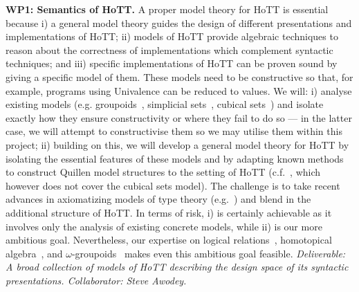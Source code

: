 \documentclass[a4paper,11pt]{article}
\begin{document}
{\bf WP1: Semantics of HoTT.}  A proper model theory for HoTT is
essential because i) a general model theory guides the design of
different presentations and implementations of HoTT; ii) models of
HoTT provide algebraic techniques to reason about the correctness of
implementations which complement syntactic techniques; and iii)
specific implementations of HoTT can be proven sound by giving a
specific model of them.  These models need to be constructive so that,
for example, programs using Univalence can be reduced to values.  We
will: i) analyse existing models ({e.g.}
groupoids~\cite{HofmannM:groitt}, simplicial
sets~\cite{KapulkinC:simmuv}, cubical sets~\cite{BezemM:cubsmt}) and
isolate exactly how they ensure constructivity or where they fail to
do so --- in the latter case, we will attempt to constructivise them
so we may utilise them within this project; ii) building on this, we
will develop a general model theory for HoTT by isolating the
essential features of these models and by adapting known methods to
construct Quillen model structures to the setting of HoTT
({c.f.}~\cite{ShulmanM:uniidh}, which however does not cover the
cubical sets model).  The challenge is to take recent advances in
axiomatizing models of type theory ({e.g.}~\cite{AwodeyS:natmtt}) and
blend in the additional structure of HoTT. In terms of risk, i) is
certainly achievable as it involves only the analysis of existing
concrete models, while ii) is our more ambitious goal. Nevertheless,
our expertise on logical relations~\cite{neil2014relParamDep},
homotopical algebra~\cite{GambinoN:homl2c,GambinoN:weilsh}, and
$\omega$-groupoids~\cite{alti:csl12,alti:tlca13-hedberg} makes even
this ambitious goal feasible. {\em Deliverable: A broad collection of
  models of HoTT describing the design space of its syntactic
  presentations.  Collaborator: Steve Awodey.  }
\end{document}

